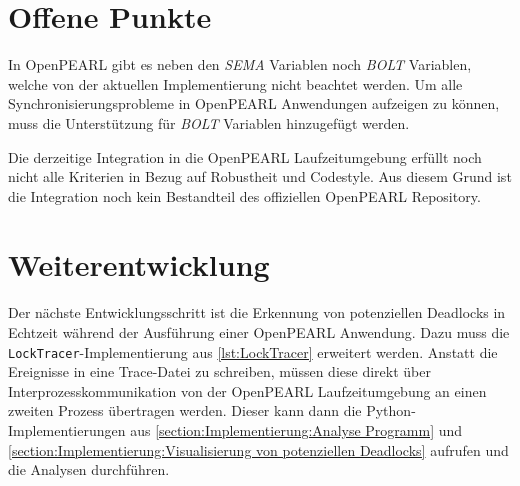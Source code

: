 \section{Offene Punkte}
\label{section:OffenePunkte}
In OpenPEARL gibt es neben den \textit{SEMA} Variablen noch \textit{BOLT}
Variablen, welche von der aktuellen Implementierung nicht beachtet werden. Um
alle Synchronisierungsprobleme in OpenPEARL Anwendungen aufzeigen zu können,
muss die Unterstützung für \textit{BOLT} Variablen hinzugefügt werden.

Die derzeitige Integration in die OpenPEARL Laufzeitumgebung erfüllt noch nicht
alle Kriterien in Bezug auf Robustheit und Codestyle. Aus diesem Grund ist die
Integration noch kein Bestandteil des offiziellen OpenPEARL Repository.

\section{Weiterentwicklung}
\label{section:Weiterentwicklung}
Der nächste Entwicklungsschritt ist die Erkennung von potenziellen Deadlocks in
Echtzeit während der Ausführung einer OpenPEARL Anwendung. Dazu muss die
\texttt{LockTracer}-Implementierung aus \cref{lst:LockTracer} erweitert werden.
Anstatt die Ereignisse in eine Trace-Datei zu schreiben, müssen diese direkt
über Interprozesskommunikation von der OpenPEARL Laufzeitumgebung an einen
zweiten Prozess übertragen werden. Dieser kann dann die Python-Implementierungen
aus \cref{section:Implementierung:Analyse Programm} und
\cref{section:Implementierung:Visualisierung von potenziellen Deadlocks}
aufrufen und die Analysen durchführen.
